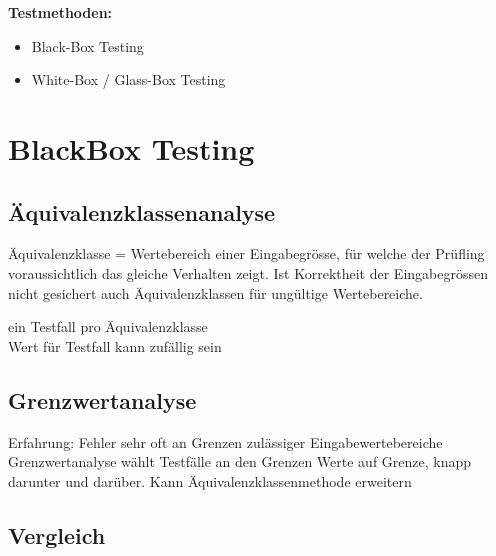\textbf{Testmethoden: }
\begin{itemize}
	\item Black-Box Testing
	\item White-Box / Glass-Box Testing
\end{itemize}

	
\section{BlackBox Testing}

\subsection{Äquivalenzklassenanalyse}
Äquivalenzklasse = Wertebereich einer 
Eingabegrösse, für welche der Prüfling 
voraussichtlich das gleiche Verhalten zeigt.
Ist Korrektheit der Eingabegrössen nicht 
gesichert auch Äquivalenzklassen für ungültige 
Wertebereiche.

ein Testfall pro Äquivalenzklasse \\
Wert für Testfall kann zufällig sein

\subsection{Grenzwertanalyse}

Erfahrung: Fehler sehr oft an Grenzen 
zulässiger Eingabewertebereiche 
Grenzwertanalyse wählt Testfälle an den 
Grenzen
Werte auf Grenze, knapp darunter und 
darüber.
Kann Äquivalenzklassenmethode erweitern

\subsection{Vergleich} 

